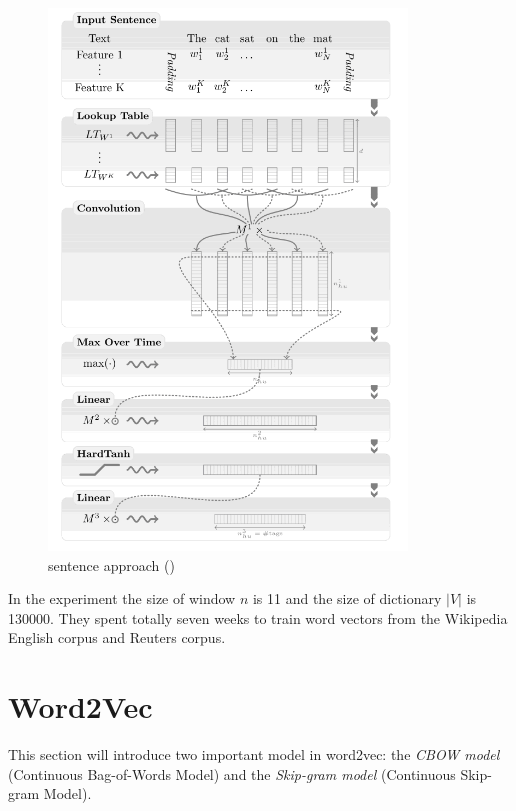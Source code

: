 \begin{figure}[H]
\begin{minipage}{.5\textwidth}
	\includegraphics[width=0.85\textwidth]{cw2}
	\caption{sentence approach (\citep{CollobertWestonEtAl2011})}
	\label{fig:cw2}
\end{minipage}
\end{figure}

In the experiment the size of window $n$ is 11 and the size of dictionary $|V|$ is 130000. They spent totally seven weeks to train word vectors from the Wikipedia English corpus and Reuters corpus.

\section{Word2Vec}
This section will introduce two important model in word2vec: the \emph{CBOW model} (Continuous Bag-of-Words Model) and the \emph{Skip-gram model} (Continuous Skip-gram Model). 

